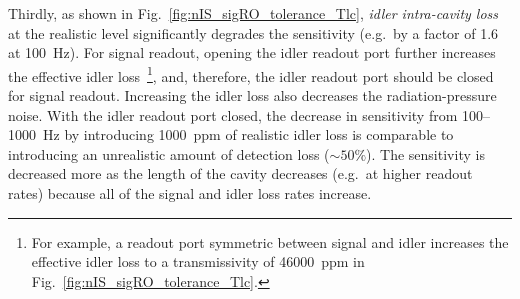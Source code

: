 Thirdly, as shown in Fig.~\ref{fig:nIS_sigRO_tolerance_Tlc}, \emph{idler intra-cavity loss} at the realistic level significantly degrades the sensitivity (e.g.\ by a factor of 1.6 at 100~Hz). For signal readout, opening the idler readout port further increases the effective idler loss~\footnote{For example, a readout port symmetric between signal and idler increases the effective idler loss to a transmissivity of 46000~ppm in Fig.~\ref{fig:nIS_sigRO_tolerance_Tlc}.}, and, therefore, the idler readout port should be closed for signal readout. Increasing the idler loss also decreases the radiation-pressure noise. With the idler readout port closed, the decrease in sensitivity from 100--1000~Hz by introducing 1000~ppm of realistic idler loss is comparable to introducing an unrealistic amount of detection loss ($\sim50\%$). The sensitivity is decreased more as the length of the cavity decreases (e.g.\ at higher readout rates) because all of the signal and idler loss rates increase. 

